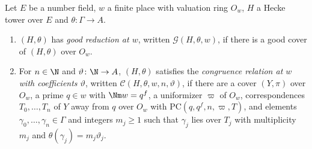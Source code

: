 \begin{definition}\label{pf:ks2:def:goodatw}
Let $E$ be a number field, $w$ a finite place with valuation ring $O_w$, $H$ a Hecke tower over
$E$ and $\theta\colon\Gamma\to A$.
\begin{enumerate}
\item $(H,\theta)$ has \emph{good reduction at $w$}, written $\mathcal{G}(H,\theta,w)$, if there is a
  good cover of $(H,\theta)$ over $O_w$.
\item For $n\in\N$ and $\vartheta\colon\N\to A$, $(H,\theta)$ satisfies the \emph{congruence relation
  at $w$ with coefficients $\vartheta$}, written $\mathcal{C}(H,\theta,w,n,\vartheta)$, if there are a
  cover $(Y,\pi)$ over $O_w$, a prime
  $q\in w$ with $\Nm w=q^f$, a uniformizer $\varpi$ of $O_w$, correspondences $T_0,\dots,T_n$ of
  $Y$ away from $q$ over $O_w$ with $\mathrm{PC}(q,q^f,n,\varpi,T)$, and elements
  $\gamma_0,\dots,\gamma_n\in\Gamma$ and integers $m_j\ge1$ such that $\gamma_j$ lies over $T_j$
  with multiplicity $m_j$ and $\theta(\gamma_j)=m_j\vartheta_j$.
\end{enumerate}
\end{definition}

